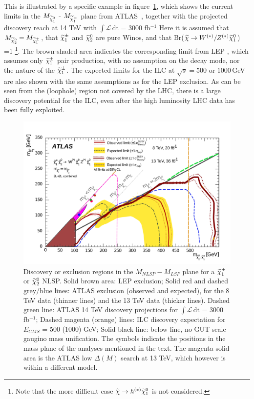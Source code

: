 This is illustrated by a specific example in figure~\ref{fig:searches_bosinoexcl}, 
which shows the current limits in the $\mbox{$ M_{\widetilde{\chi}^0_1} $}$ - $\mbox{$ M_{\widetilde{\chi}^{\pm}_1} $}$ 
plane from ATLAS~\cite{Aad:2014vma}, together with the
projected discovery reach at 14 TeV with $\int \mathcal{L} \, \mathrm{dt}$ = 3000 
fb$^{-1}$ \cite{ATL-PHYS-PUB-2018-048}
Here it is assumed that  $\mbox{$ M_{\widetilde{\chi}^0_2} $}=\mbox{$ M_{\widetilde{\chi}^{\pm}_1} $}$, that $\mbox{$ \widetilde{\chi}^{\pm}_1 $}$ and $\mbox{$ \widetilde{\chi}^0_2 $}$ are 
pure Winos, and that Br($\widetilde{\chi}\rightarrow W^{(*)}/Z^{(*)}\mbox{$ \widetilde{\chi}^0_1 $}$)
=1
\footnote{Note that the more difficult case $\widetilde{\chi}\rightarrow h^{(*)}\mbox{$ \widetilde{\chi}^0_1 $}$ is 
not considered.}.
The brown-shaded area indicates the corresponding limit from LEP 
\cite{Heister:2002mn,Abdallah:2003xe,Abbiendi:2002vz},
which assumes only  $\mbox{$ \widetilde{\chi}^{\pm}_1 $}$ pair production, with no assumption on the decay mode,
nor the nature of the $\mbox{$ \widetilde{\chi}^{\pm}_1 $}$.
The expected limits for the ILC at $\sqrt{s}=500$ or $1000$\,GeV are also shown 
with the same 
assumptions as for the LEP exclusion.
As can be seen from the (loophole) region not covered by the LHC, there is a large
discovery potential for the ILC, even after the high luminosity LHC data has been 
fully exploited.

\begin{figure}[]
   \centering
      \includegraphics[width=0.5\linewidth]{chapters/figures/fig_08d_w_lep_w_lhc_lodm_w_bmark_w_hlproj_w500_w1000}
\caption{Discovery or exclusion regions in the $M_{NLSP} - M_{LSP}$ plane
  for a $\mbox{$ \widetilde{\chi}^{\pm}_1 $}$ or $\mbox{$ \widetilde{\chi}^0_2 $}$ NLSP. Solid brown area: LEP exclusion;
  Solid red and dashed grey/blue lines: ATLAS exclusion (observed and expected),
  for the 8 TeV data (thinner lines) and the 13 TeV data (thicker lines).
  Dashed green line: ATLAS 14 TeV discovery projections for $\int \mathcal{L} \, \mathrm{dt}$ = 3000 fb$^{-1}$;
  Dashed magenta (orange) lines: ILC discovery expectation for $E_{CMS}$ = 500 (1000) GeV;
  Solid black line: below line, no GUT scale gaugino mass unification.
  The symbols indicate the positions in the mass-plane of the analyses mentioned in the text.
  The magenta solid area is the ATLAS low $\Delta(M)$ search at 13 TeV, which however is within a different model.
 \label{fig:searches_bosinoexcl}}
\end{figure}

